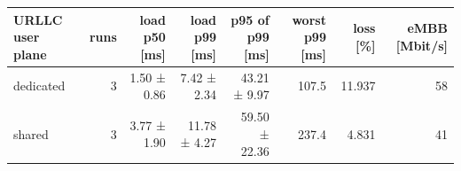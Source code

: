 \begin{tabular}{lrrrrrrr}
\toprule
URLLC user plane & runs & load p50 [ms] & load p99 [ms] & p95 of p99 [ms] & worst p99 [ms] & loss [\%] & eMBB [Mbit/s] \\
\midrule
dedicated & 3 & 1.50 ± 0.86 & 7.42 ± 2.34 & 43.21 ± 9.97 & 107.5 & 11.937 & 58 \\
shared & 3 & 3.77 ± 1.90 & 11.78 ± 4.27 & 59.50 ± 22.36 & 237.4 & 4.831 & 41 \\
\bottomrule
\end{tabular}
